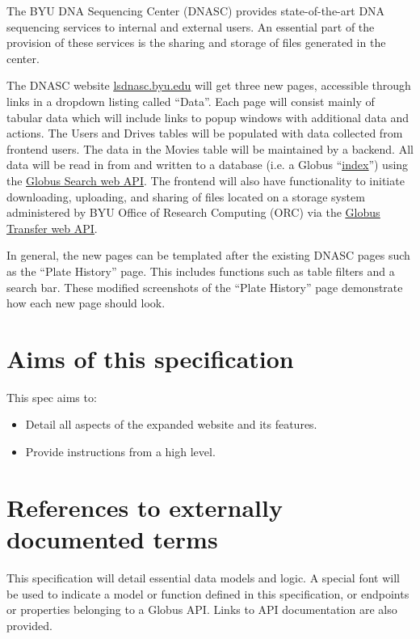 
The BYU DNA Sequencing Center (DNASC) provides state-of-the-art DNA sequencing services to internal and external 
users. An essential part of the provision of these services is the sharing and storage of files generated in the 
center.

The DNASC website \href{https://lsdnasc.byu.edu}{\uline{lsdnasc.byu.edu}} will get three new pages, accessible through links in a dropdown 
listing called ``Data''. Each page will consist mainly of tabular data which will include links to popup windows with 
additional data and actions. The Users and Drives tables will be populated with data collected from frontend 
users. The data in the Movies table will be maintained by a backend. All data will be read in from and written 
to a database (i.e. a Globus ``\href{https://docs.globus.org/api/search/overview/#search\_indices}{\uline{index}}'') using the 
\href{https://docs.globus.org/api/search/}{\uline{Globus Search web API}}. The frontend will also have functionality 
to initiate downloading, uploading, and sharing of files located on a storage system administered by BYU Office 
of Research Computing (ORC) via the \href{https://docs.globus.org/api/transfer/}{\uline{Globus Transfer web API}}.

In general, the new pages can be templated after the existing DNASC pages such as the ``Plate History'' page. This 
includes functions such as table filters and a search bar. 
These modified screenshots of the ``Plate History'' page 
demonstrate how each new page should look.

\section{Aims of this specification}

This spec aims to:

\begin{itemize}
  \item Detail all aspects of the expanded website and its features.
  \item Provide instructions from a high level.
\end{itemize}

\section{References to externally documented terms}

This specification will detail essential data models and logic. A special font will be used to indicate a model 
or function defined in this specification, or endpoints or properties belonging to a Globus API. Links to API 
documentation are also provided.

